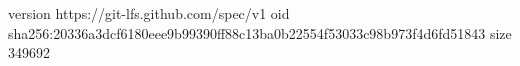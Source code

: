 version https://git-lfs.github.com/spec/v1
oid sha256:20336a3dcf6180eee9b99390ff88c13ba0b22554f53033c98b973f4d6fd51843
size 349692
